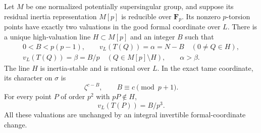 \begin{lemma}
\label{lem:B-RD60-Newton}
Let $M$ be one normalized potentially supersingular group, and
suppose its residual inertia representation $M[p]$ is reducible over
$\mathbf F_p$. Its nonzero $p$-torsion points have exactly two
valuations in the good formal coordinate over $L$. There is a unique
high-valuation line $H\subset M[p]$ and an integer $B$ such that
\[
 \begin{gathered}
 0<B<p(p-1),\qquad
 v_L(T(Q))=\alpha=N-B\quad(0\ne Q\in H),\\
 v_L(T(Q))=\beta=B/p\quad(Q\in M[p]\setminus H),\qquad
 \alpha>\beta.                                        \tag{B-RD60.3}
 \end{gathered}
\]
The line $H$ is inertia-stable and is rational over $L$.
In the exact tame coordinate, its character on $\sigma$ is
\[
                  \zeta^{c-B},\qquad
                         B\equiv c\pmod{p+1}.         \tag{B-RD60.4}
\]
For every point $P$ of order $p^2$ with $pP\notin H$,
\[
                       v_L(T(P))=B/p^3.               \tag{B-RD60.5}
\]
All these valuations are unchanged by an integral invertible
formal-coordinate change.
\end{lemma}
